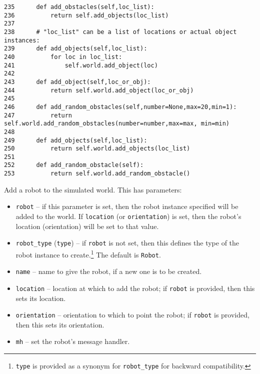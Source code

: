 \documentclass[11pt]{tufte-handout}
\begin{document}
\begin{verbatim}
235      def add_obstacles(self,loc_list):
236          return self.add_objects(loc_list)
237  
238      # "loc_list" can be a list of locations or actual object instances:
239      def add_objects(self,loc_list):
240          for loc in loc_list:
241              self.world.add_object(loc)
242  
243      def add_object(self,loc_or_obj):
244          return self.world.add_object(loc_or_obj)
245  
246      def add_random_obstacles(self,number=None,max=20,min=1):
247          return self.world.add_random_obstacles(number=number,max=max, min=min)
248  
249      def add_objects(self,loc_list):
250          return self.world.add_objects(loc_list)
251  
252      def add_random_obstacle(self):
253          return self.world.add_random_obstacle()
\end{verbatim}

Add  a robot to the simulated world.  This has parameters:
\begin{itemize}
\item \texttt{robot} -- if this parameter is set, then the robot instance specified will be added to the world.  If \texttt{location} (or \texttt{orientation}) is set, then the robot's location (orientation) will be set to that value.
\item \texttt{robot\_type} (\texttt{type}) -- if \texttt{robot} is not set, then this defines the type of the robot instance to create.\footnote{\texttt{type} is provided as a synonym for \texttt{robot\_type} for backward compatibility.}  The default is \texttt{Robot}.
\item \texttt{name} -- name to give the robot, if a new one is to be created.
\item \texttt{location} -- location at which to add the robot; if \texttt{robot} is provided, then this sets its location.
\item \texttt{orientation} -- orientation to which to point the robot; if \texttt{robot} is provided, then this sets its orientation.
\item \texttt{mh} -- set the robot's message handler.
\end{itemize}
\end{document}
